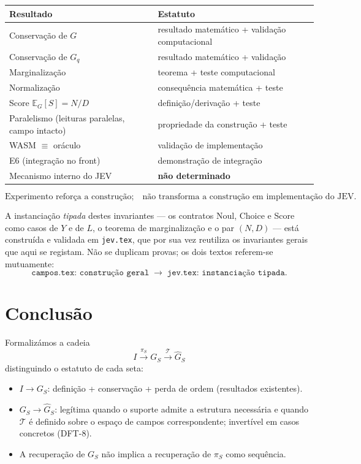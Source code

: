\documentclass[11pt,a4paper]{article}
\begin{document}
\begin{center}
\small
\begin{tabular}{@{}p{}p{}@{}}
\toprule
\textbf{Resultado} & \textbf{Estatuto} \\
\midrule
Conservação de \(G\) & resultado matemático + validação computacional \\
Conservação de \(G_q\) & resultado matemático + validação \\
Marginalização & teorema + teste computacional \\
Normalização & consequência matemática + teste \\
Score \(\mathbb E_G[S]=N/D\) & definição/derivação + teste \\
Paralelismo (leituras paralelas, campo intacto) & propriedade da construção + teste \\
WASM $\equiv$ oráculo & validação de implementação \\
E6 (integração no front) & demonstração de integração \\
Mecanismo interno do JEV & \textbf{não determinado} \\
\bottomrule
\end{tabular}
\end{center}

\[
\boxed{\text{Experimento reforça a construção;}\quad
\text{não transforma a construção em implementação do JEV.}}
\]

A instanciação \emph{tipada} destes invariantes --- os contratos Noul, Choice
e Score como casos de \(Y\) e de \(L\), o teorema de marginalização e o par
\((N,D)\) --- está construída e validada em \texttt{jev.tex}, que por sua vez
reutiliza os invariantes gerais que aqui se registam. Não se duplicam provas;
os dois textos referem-se mutuamente:
\[
\boxed{
\texttt{campos.tex: construção geral}
\;\longrightarrow\;
\texttt{jev.tex: instanciação tipada}.
}
\]

\section{Conclusão}

Formalizámos a cadeia
\[
I\xrightarrow{\pi_S}G_S\xrightarrow{\mathcal T}\widehat G_S
\]
distinguindo o estatuto de cada seta:
\begin{itemize}[leftmargin=1.5em]
\item \(I\to G_S\): definição + conservação + perda de ordem (resultados existentes).
\item \(G_S\to\widehat G_S\): legítima quando o suporte admite a estrutura necessária e quando \(\mathcal T\) é definido sobre o espaço de campos correspondente; invertível em casos concretos (DFT-8).
\item A recuperação de \(G_S\) não implica a recuperação de \(\pi_S\) como sequência.
\end{itemize}
\end{document}
